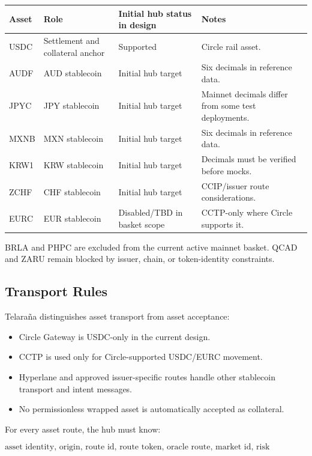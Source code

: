 \documentclass[11pt]{article}
\newcommand{\protocol}{Telara\~na}
\begin{document}
\begin{center}
\begin{tabular}{llll}
\toprule
Asset & Role & Initial hub status in design & Notes \\
\midrule
USDC & Settlement and collateral anchor & Supported & Circle rail asset. \\
AUDF & AUD stablecoin & Initial hub target & Six decimals in reference data. \\
JPYC & JPY stablecoin & Initial hub target & Mainnet decimals differ from some test deployments. \\
MXNB & MXN stablecoin & Initial hub target & Six decimals in reference data. \\
KRW1 & KRW stablecoin & Initial hub target & Decimals must be verified before mocks. \\
ZCHF & CHF stablecoin & Initial hub target & CCIP/issuer route considerations. \\
EURC & EUR stablecoin & Disabled/TBD in basket scope & CCTP-only where Circle supports it. \\
\bottomrule
\end{tabular}
\end{center}

BRLA and PHPC are excluded from the current active mainnet basket. QCAD and
ZARU remain blocked by issuer, chain, or token-identity constraints.

\subsection{Transport Rules}

\protocol{} distinguishes asset transport from asset acceptance:

\begin{itemize}
  \item Circle Gateway is USDC-only in the current design.
  \item CCTP is used only for Circle-supported USDC/EURC movement.
  \item Hyperlane and approved issuer-specific routes handle other stablecoin
        transport and intent messages.
  \item No permissionless wrapped asset is automatically accepted as
        collateral.
\end{itemize}

For every asset route, the hub must know:

\[
  \text{asset identity, origin, route id, route token, oracle route, market id, risk parameters.}
\]
\end{document}
